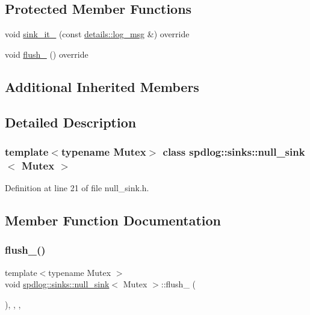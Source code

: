 \subsection*{Protected Member Functions}
\begin{DoxyCompactItemize}
\item 
void \hyperlink{classspdlog_1_1sinks_1_1null__sink_a158c702167f6a46609de2c561f82973c}{sink\+\_\+it\+\_\+} (const \hyperlink{structspdlog_1_1details_1_1log__msg}{details\+::log\+\_\+msg} \&) override
\item 
void \hyperlink{classspdlog_1_1sinks_1_1null__sink_a074c0d22167808789440953111a97926}{flush\+\_\+} () override
\end{DoxyCompactItemize}
\subsection*{Additional Inherited Members}


\subsection{Detailed Description}
\subsubsection*{template$<$typename Mutex$>$\newline
class spdlog\+::sinks\+::null\+\_\+sink$<$ Mutex $>$}



Definition at line 21 of file null\+\_\+sink.\+h.



\subsection{Member Function Documentation}
\mbox{\label{classspdlog_1_1sinks_1_1null__sink_a074c0d22167808789440953111a97926}} 
\subsubsection{\texorpdfstring{flush\+\_\+()}{flush\_()}}
{\footnotesize\ttfamily template$<$typename Mutex $>$ \\
void \hyperlink{classspdlog_1_1sinks_1_1null__sink}{spdlog\+::sinks\+::null\+\_\+sink}$<$ Mutex $>$\+::flush\+\_\+ (\begin{DoxyParamCaption}{ }\end{DoxyParamCaption})\hspace{0.3cm}{\ttfamily [inline]}, {\ttfamily [override]}, {\ttfamily [protected]}, {\ttfamily [virtual]}}




